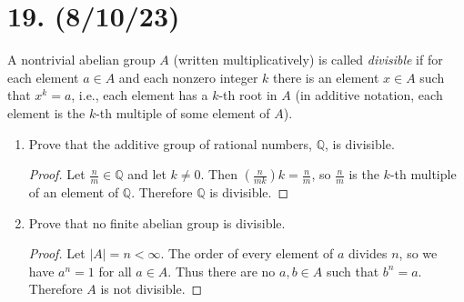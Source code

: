 \documentclass{article}
\begin{document}
\section*{19. (8/10/23)}

A nontrivial abelian group $A$ (written multiplicatively) is called \emph{divisible} if for each element $a \in A$ and each nonzero integer $k$ there is an element $x \in A$ such that $x^k = a$, i.e., each element has a $k$-th root in $A$ (in additive notation, each element is the $k$-th multiple of some element of $A$).

\begin{enumerate}[label=(\alph*), itemsep=0em]
    \item Prove that the additive group of rational numbers, $\mathbb{Q}$, is divisible.
          \begin{proof}
            Let $\frac{n}{m} \in \mathbb{Q}$ and let $k \neq 0$. Then $(\frac{n}{mk})k = \frac{n}{m}$, so $\frac{n}{m}$ is the $k$-th multiple of an element of $\mathbb{Q}$. Therefore $\mathbb{Q}$ is divisible.
          \end{proof}
    \item Prove that no finite abelian group is divisible.
          \begin{proof}
            Let $|A| = n < \infty$. The order of every element of $a$ divides $n$, so we have $a^n = 1$ for all $a \in A$. Thus there are no $a, b \in A$ such that $b^n = a$. Therefore $A$ is not divisible.
          \end{proof}
\end{enumerate}
\end{document}

